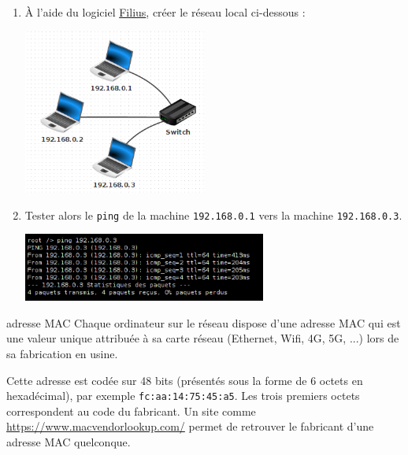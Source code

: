 \documentclass[a4paper,dvipsnames]{article}
\begin{document}
\begin{activite}[breakable]{}{}
  \begin{enumerate}
    \item À l'aide du logiciel \href{https://www.lernsoftware-filius.de/Herunterladen}{Filius}, créer le réseau local ci-dessous :

      \begin{center}
	\includegraphics[width=6cm]{img/f1.png}
      \end{center}

    \item Tester alors le \texttt{ping} de la machine \texttt{192.168.0.1} vers la machine \texttt{192.168.0.3}.

      \begin{center}
	\includegraphics[width=8cm]{img/ft1.png}
      \end{center}
  \end{enumerate}
\end{activite}

\medskip

\begin{definition}[breakable]{adresse MAC}{}
  Chaque ordinateur sur le réseau dispose d'une adresse MAC qui est une valeur unique attribuée à sa carte réseau (Ethernet, Wifi, 4G, 5G, ...) lors de sa fabrication en usine.

  \smallskip

  Cette adresse est codée sur 48 bits (présentés sous la forme de 6 octets en hexadécimal), par exemple \texttt{fc:aa:14:75:45:a5}. Les trois premiers octets correspondent au code du fabricant. Un site comme \url{https://www.macvendorlookup.com/} permet de retrouver le fabricant d'une adresse MAC quelconque. 
\end{definition}
\end{document}

